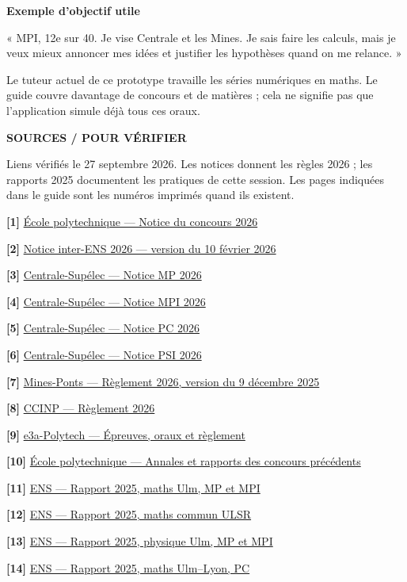 \documentclass[10pt,a4paper]{article}
\newcommand{\titre}[2]{{\sffamily\small\bfseries\color{teal}#1}\par\vspace{3mm}{\sffamily\bfseries\fontsize{24}{28}\selectfont #2}\par\vspace{3mm}}
\newcommand{\note}[1]{\par{\small\color{muted}#1}\par}
\newcommand{\bloc}[2]{\par\begingroup\setlength{\fboxsep}{4mm}\colorbox{wash}{\parbox{\dimexpr\linewidth-8mm\relax}{\sffamily\bfseries #1\par\normalfont #2}}\endgroup\par}
\newcommand{\lien}[3]{\par\hypertarget{src:#1}{}\label{src:#1}\textbf{[#1]} \href{#3}{#2}\par}
\begin{document}
\bloc{Exemple d'objectif utile}{« MPI, 12e sur 40. Je vise Centrale et les Mines. Je sais faire les calculs, mais je veux mieux annoncer mes idées et justifier les hypothèses quand on me relance. »}
\note{Le tuteur actuel de ce prototype travaille les séries numériques en maths. Le guide couvre davantage de concours et de matières ; cela ne signifie pas que l'application simule déjà tous ces oraux.}
\newpage
\titre{SOURCES / POUR VÉRIFIER}{Notices et rapports officiels}
\note{Liens vérifiés le 27 septembre 2026. Les notices donnent les règles 2026 ; les rapports 2025 documentent les pratiques de cette session. Les pages indiquées dans le guide sont les numéros imprimés quand ils existent.}
\begingroup\small\setlength{\parskip}{3.5pt}
\lien{1}{École polytechnique — Notice du concours 2026}{https://www.polytechnique.edu/admission-cycle-ingenieur/sites/admission/files/content/Notice\%20du\%20concours\%202026\%20publi\%C3\%A9e.pdf}
\lien{2}{Notice inter-ENS 2026 — version du 10 février 2026}{https://www.ens.psl.eu/sites/default/files/notice_interens_2026_mise_en_ligne_vf10022026_.pdf}
\lien{3}{Centrale-Supélec — Notice MP 2026}{https://www.concours-centrale-supelec.fr/sites/default/files/documents/CCS_2026_MP.pdf}
\lien{4}{Centrale-Supélec — Notice MPI 2026}{https://www.concours-centrale-supelec.fr/sites/default/files/documents/CCS_2026_MPI.pdf}
\lien{5}{Centrale-Supélec — Notice PC 2026}{https://www.concours-centrale-supelec.fr/sites/default/files/documents/CCS_2026_PC.pdf}
\lien{6}{Centrale-Supélec — Notice PSI 2026}{https://www.concours-centrale-supelec.fr/sites/default/files/documents/CCS_2026_PSI.pdf}
\lien{7}{Mines-Ponts — Règlement 2026, version du 9 décembre 2025}{https://concoursminesponts.fr/wp-content/uploads/2025/12/reglement-2026-09.12.25.pdf}
\lien{8}{CCINP — Règlement 2026}{https://www.concours-commun-inp.fr/_resource/R\%C3\%A8glement_VF_23-06.pdf?download=true}
\lien{9}{e3a-Polytech — Épreuves, oraux et règlement}{https://www.e3a-polytech.fr/epreuves/}
\lien{10}{École polytechnique — Annales et rapports des concours précédents}{https://www.polytechnique.edu/admission-cycle-ingenieur/en/node/258}
\lien{11}{ENS — Rapport 2025, maths Ulm, MP et MPI}{https://banques-ecoles.fr/cms/wp-content/uploads/2025/11/Rapport_ORAL_MATH-ULM_2025.pdf}
\lien{12}{ENS — Rapport 2025, maths commun ULSR}{https://banques-ecoles.fr/cms/wp-content/uploads/2025/11/Rapport_ORAL_Math_ULSR_2025.pdf}
\lien{13}{ENS — Rapport 2025, physique Ulm, MP et MPI}{https://banques-ecoles.fr/cms/wp-content/uploads/2025/11/Rapport_Oral_Physique-Ulm-2025.pdf}
\lien{14}{ENS — Rapport 2025, maths Ulm--Lyon, PC}{https://banques-ecoles.fr/cms/wp-content/uploads/2025/11/Rapport_Oral_Math_UL_PC_2025.pdf}
\end{document}
